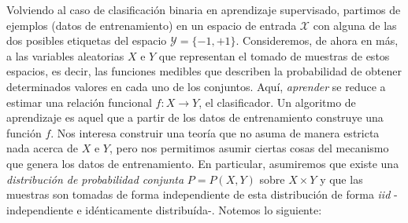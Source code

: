 \documentclass{report}
\begin{document}
Volviendo al caso de clasificación binaria en aprendizaje supervisado, partimos de ejemplos (datos de entrenamiento)
en un espacio de entrada $\mathcal{X}$ con alguna de las dos posibles etiquetas del espacio $\mathcal{Y}=\{-1,+1\}$. Consideremos,
de ahora en más, a las variables aleatorias $X$ e $Y$ que representan el tomado de muestras de estos espacios, es decir,
las funciones medibles que describen la probabilidad de obtener determinados valores en cada uno de los conjuntos. Aquí, \textit{aprender}
se reduce a estimar una relación funcional $f:X\rightarrow Y$, el clasificador. Un algoritmo de aprendizaje es aquel
que a partir de los datos de entrenamiento construye una función $f$. Nos interesa construir una teoría que no asuma
de manera estricta nada acerca de $X$ e $Y$, pero nos permitimos asumir ciertas cosas del mecanismo que genera los
datos de entrenamiento. En particular, asumiremos que existe una \textit{distribución de probabilidad conjunta} $P=P(X,Y)$
sobre $X\times Y$ y que las muestras son tomadas de forma independiente de esta distribución de forma \textit{iid} -independiente
e idénticamente distribuída-. Notemos lo siguiente:
\end{document}
